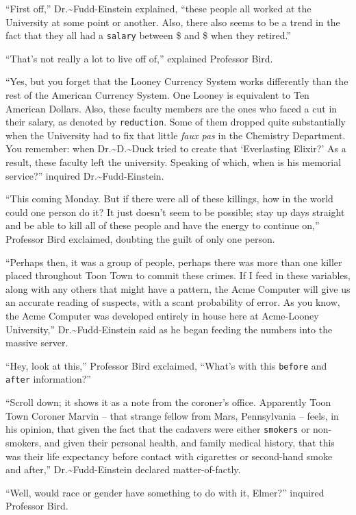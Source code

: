 \documentclass[captions=tableheading]{scrbook}
\begin{document}
“First off,” Dr.\~{}Fudd-Einstein explained, “these people all worked at the University at some point or another. Also, there also seems to be a trend in the fact that they all had a \texttt{salary} between \$ 
 and \$ 
 when they retired.” 

“That’s not really a lot to live off of,” explained Professor Bird. 

“Yes, but you forget that the Looney Currency System works differently than the rest of the American Currency System. One Looney is equivalent to Ten American Dollars. Also, these faculty members are the ones who faced a cut in their salary, as denoted by \texttt{reduction}. Some of them dropped quite substantially when the University had to fix that little \emph{faux pas} in the Chemistry Department. You remember: when Dr.\~{}D.\~{}Duck tried to create that ‘Everlasting Elixir?’ As a result, these faculty left the university. Speaking of which, when is his memorial service?” inquired Dr.\~{}Fudd-Einstein. 

“This coming Monday. But if there were all of these killings, how in the world could one person do it? It just doesn’t seem to be possible; stay up 
 days straight and be able to kill all of these people and have the energy to continue on,” Professor Bird exclaimed, doubting the guilt of only one person. 

“Perhaps then, it was a group of people, perhaps there was more than one killer placed throughout Toon Town to commit these crimes. If I feed in these variables, along with any others that might have a pattern, the Acme Computer will give us an accurate reading of suspects, with a scant probability of error. As you know, the Acme Computer was developed entirely in house here at Acme-Looney University,” Dr.\~{}Fudd-Einstein said as he began feeding the numbers into the massive server. 

“Hey, look at this,” Professor Bird exclaimed, “What’s with this \texttt{before} and \texttt{after} information?” 

“Scroll down; it shows it as a note from the coroner’s office. Apparently Toon Town Coroner Marvin -- that strange fellow from Mars, Pennsylvania -- feels, in his opinion, that given the fact that the cadavers were either \texttt{smokers} or non-smokers, and given their personal health, and family medical history, that this was their life expectancy before contact with cigarettes or second-hand smoke and after,” Dr.\~{}Fudd-Einstein declared matter-of-factly. 

“Well, would race or gender have something to do with it, Elmer?” inquired Professor Bird.
\end{document}
